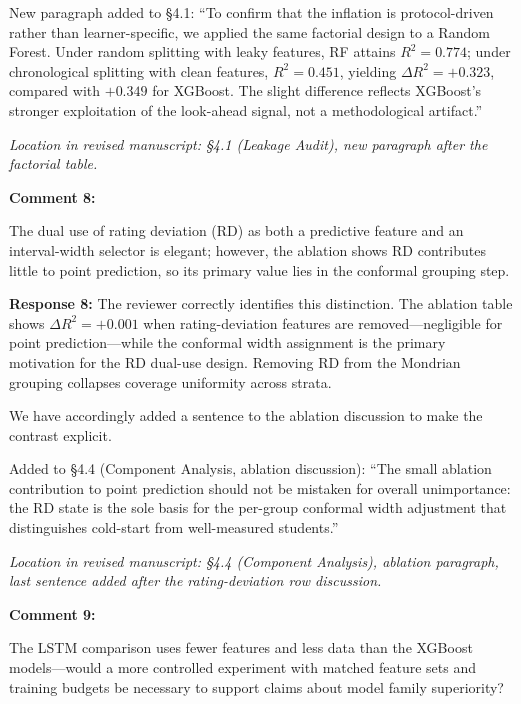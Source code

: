 \documentclass[11pt]{article}
\newcommand{\rev}[1]{{\color{ccolor}#1}}
\begin{document}
\rev{New paragraph added to \S4.1: ``To confirm that the inflation is protocol-driven
rather than learner-specific, we applied the same factorial design to a Random Forest.
Under random splitting with leaky features, RF attains $R^2 = 0.774$; under
chronological splitting with clean features, $R^2 = 0.451$, yielding
$\Delta R^2 = +0.323$, compared with $+0.349$ for XGBoost. The slight difference
reflects XGBoost's stronger exploitation of the look-ahead signal, not a methodological
artifact.''}

\textit{Location in revised manuscript: \S4.1 (Leakage Audit), new paragraph after
the factorial table.}

\bigskip

\textbf{Comment 8:}
\begin{rquote}
The dual use of rating deviation (RD) as both a predictive feature and an
interval-width selector is elegant; however, the ablation shows RD contributes little
to point prediction, so its primary value lies in the conformal grouping step.
\end{rquote}

\textbf{Response 8:}
The reviewer correctly identifies this distinction.
The ablation table shows $\Delta R^2 = +0.001$ when rating-deviation features are
removed---negligible for point prediction---while the conformal width assignment is the
primary motivation for the RD dual-use design. Removing RD from the Mondrian grouping
collapses coverage uniformity across strata.

We have accordingly added a sentence to the ablation discussion to make the contrast
explicit.

\rev{Added to \S4.4 (Component Analysis, ablation discussion): ``The small ablation contribution to point
prediction should not be mistaken for overall unimportance: the RD state is the sole
basis for the per-group conformal width adjustment that distinguishes cold-start from
well-measured students.''}

\begin{sloppypar}
\textit{Location in revised manuscript: \S4.4 (Component Analysis), ablation paragraph, last sentence
added after the rating-deviation row discussion.}
\end{sloppypar}

\bigskip

\textbf{Comment 9:}
\begin{rquote}
The LSTM comparison uses fewer features and less data than the XGBoost models---would
a more controlled experiment with matched feature sets and training budgets be
necessary to support claims about model family superiority?
\end{rquote}
\end{document}
